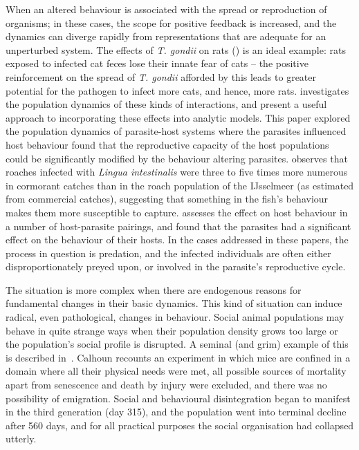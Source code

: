 When an altered behaviour is associated with the spread or
reproduction of organisms; in these cases, the scope for positive
feedback is increased, and the dynamics can diverge rapidly from
representations that are adequate for an unperturbed system.  The
effects of \emph{T. gondii} on rats (\citep{berdoy2000fatal}) is an
ideal example: rats exposed to infected cat feces lose their innate
fear of cats -- the positive reinforcement on the spread
of \emph{T. gondii} afforded by this leads to greater potential for
the pathogen to infect more cats, and hence, more
rats.  investigates the population
dynamics of these kinds of interactions, and present a useful approach
to incorporating these effects into analytic models. This paper
explored the population dynamics of parasite-host systems where the
parasites influenced host behaviour found that the reproductive
capacity of the host populations could be significantly modified by
the behaviour altering parasites.  observes that
roaches infected with \emph{Lingua intestinalis} were three to five
times more numerous in cormorant catches than in the roach population
of the IJsselmeer (as estimated from commercial catches), suggesting
that something in the fish's behaviour makes them more susceptible to
capture. \Cite{poulin1994meta} assesses the effect on host behaviour
in a number of host-parasite pairings, and found that the parasites
had a significant effect on the behaviour of their hosts.  In the
cases addressed in these papers, the process in question is predation,
and the infected individuals are often either disproportionately
preyed upon, or involved in the parasite's reproductive cycle.

The situation is more complex when there are endogenous reasons for
fundamental changes in their basic dynamics. This kind of situation
can induce radical, even pathological, changes in behaviour.  Social
animal populations may behave in quite strange ways when their
population density grows too large or the population's social profile
is disrupted.  A seminal (and grim) example of this is described
in~\cite{calhoun1973death}. Calhoun recounts an experiment in which
mice are confined in a domain where all their physical needs were met,
all possible sources of mortality apart from senescence and death by
injury were excluded, and there was no possibility of emigration.
Social and behavioural disintegration began to manifest in the third
generation (day 315), and the population went into terminal decline
after 560 days, and for all practical purposes the social organisation
had collapsed utterly.

